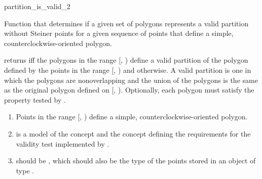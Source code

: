 \renewcommand\ccRefPageBegin{\ccParDims\cgalColumnLayout\begin{ccAdvanced}}
\renewcommand\ccRefPageEnd{\ccParDims\cgalColumnLayout\end{ccAdvanced}}
\begin{ccRefFunction}{partition_is_valid_2}

\ccDefinition

Function that determines if a given set of polygons represents
a valid partition without Steiner points for a given sequence of points that 
define a simple, counterclockwise-oriented polygon.  


{
returns  iff the polygons in the range [, 
) define a valid partition of the polygon defined by the 
points in the range [, ) and 
 otherwise.  A valid partition is one in
which the polygons are nonoverlapping and the union of the polygons is the 
same as the original polygon defined on [, ).
Optionally, each polygon must satisfy the property 
tested by . 
}

\begin{enumerate}
    \item Points in the range [, ) define
          a simple, counterclockwise-oriented polygon.
    \item {} is a model of the concept 
           and the
          concept defining the requirements for the validity test 
          implemented by .
    \item {} should be ,
          which should also be the type of the points stored in an object
          of type .
\end{enumerate}


\end{ccRefFunction}
